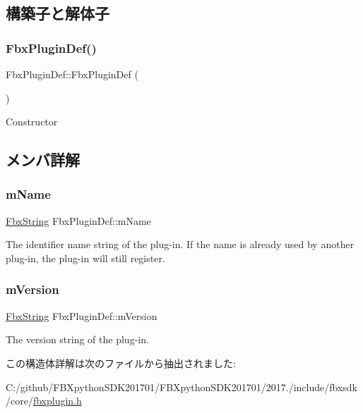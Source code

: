 \subsection{構築子と解体子}
\mbox{\label{struct_fbx_plugin_def_af1895c60f86c6d173758a6c3f6979d32}} 
\subsubsection{\texorpdfstring{Fbx\+Plugin\+Def()}{FbxPluginDef()}}
{\footnotesize\ttfamily Fbx\+Plugin\+Def\+::\+Fbx\+Plugin\+Def (\begin{DoxyParamCaption}{ }\end{DoxyParamCaption})}



Constructor 



\subsection{メンバ詳解}
\mbox{\label{struct_fbx_plugin_def_ac98378284bf666cbba614e9121ba7189}} 
\subsubsection{\texorpdfstring{m\+Name}{mName}}
{\footnotesize\ttfamily \hyperlink{class_fbx_string}{Fbx\+String} Fbx\+Plugin\+Def\+::m\+Name}



The identifier name string of the plug-\/in. If the name is already used by another plug-\/in, the plug-\/in will still register. 

\mbox{\label{struct_fbx_plugin_def_aeea048adb24ec74cb906df076bedf21d}} 
\subsubsection{\texorpdfstring{m\+Version}{mVersion}}
{\footnotesize\ttfamily \hyperlink{class_fbx_string}{Fbx\+String} Fbx\+Plugin\+Def\+::m\+Version}



The version string of the plug-\/in. 



この構造体詳解は次のファイルから抽出されました\+:\begin{DoxyCompactItemize}
\item 
C\+:/github/\+F\+B\+Xpython\+S\+D\+K201701/\+F\+B\+Xpython\+S\+D\+K201701/2017./include/fbxsdk/core/\hyperlink{fbxplugin_8h}{fbxplugin.\+h}\end{DoxyCompactItemize}
